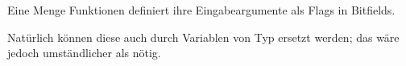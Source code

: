 \section{\BitfieldsChapter}
\label{sec:bitfields}
Eine Menge Funktionen definiert ihre Eingabeargumente als Flags in Bitfields.

Natürlich können diese auch durch Variablen von Typ \Tbool ersetzt werden; das
wäre jedoch umständlicher als nötig.








